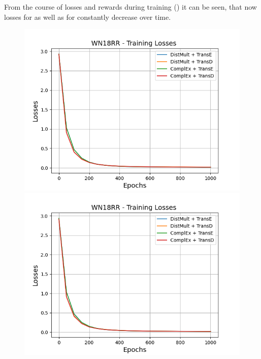 From the course of losses and rewards during training () it can be seen, that now losses for \usmax as well as for \ussoftmax constantly decrease over time.
\begin{figure}
    \centering
    \begin{minipage}{.5\textwidth}
      \centering
      \includegraphics[width=0.9\linewidth]{figures/results/gan_train/not_pretrained/uncertainty/max/entropy/wn18rr/uncertainty_wn18rr_losses.png}
    \end{minipage}%
    \begin{minipage}{.5\textwidth}
      \centering
      \includegraphics[width=0.9\linewidth]{figures/results/gan_train/not_pretrained/uncertainty/max_distribution/entropy/wn18rr/uncertainty_wn18rr_losses.png}
    \end{minipage}
    \begin{minipage}{.5\textwidth}

\end{minipage}
\end{figure}
